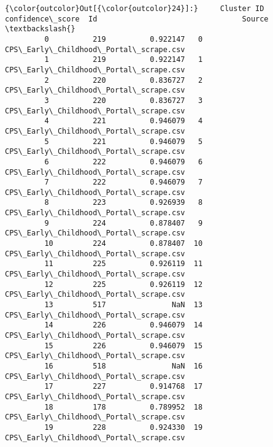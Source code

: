 \documentclass[11pt]{article}
\begin{document}
\begin{Verbatim}[commandchars=\\\{\}]
{\color{outcolor}Out[{\color{outcolor}24}]:}     Cluster ID  confidence\_score  Id                                 Source  \textbackslash{}
         0          219          0.922147   0  CPS\_Early\_Childhood\_Portal\_scrape.csv   
         1          219          0.922147   1  CPS\_Early\_Childhood\_Portal\_scrape.csv   
         2          220          0.836727   2  CPS\_Early\_Childhood\_Portal\_scrape.csv   
         3          220          0.836727   3  CPS\_Early\_Childhood\_Portal\_scrape.csv   
         4          221          0.946079   4  CPS\_Early\_Childhood\_Portal\_scrape.csv   
         5          221          0.946079   5  CPS\_Early\_Childhood\_Portal\_scrape.csv   
         6          222          0.946079   6  CPS\_Early\_Childhood\_Portal\_scrape.csv   
         7          222          0.946079   7  CPS\_Early\_Childhood\_Portal\_scrape.csv   
         8          223          0.926939   8  CPS\_Early\_Childhood\_Portal\_scrape.csv   
         9          224          0.878407   9  CPS\_Early\_Childhood\_Portal\_scrape.csv   
         10         224          0.878407  10  CPS\_Early\_Childhood\_Portal\_scrape.csv   
         11         225          0.926119  11  CPS\_Early\_Childhood\_Portal\_scrape.csv   
         12         225          0.926119  12  CPS\_Early\_Childhood\_Portal\_scrape.csv   
         13         517               NaN  13  CPS\_Early\_Childhood\_Portal\_scrape.csv   
         14         226          0.946079  14  CPS\_Early\_Childhood\_Portal\_scrape.csv   
         15         226          0.946079  15  CPS\_Early\_Childhood\_Portal\_scrape.csv   
         16         518               NaN  16  CPS\_Early\_Childhood\_Portal\_scrape.csv   
         17         227          0.914768  17  CPS\_Early\_Childhood\_Portal\_scrape.csv   
         18         178          0.789952  18  CPS\_Early\_Childhood\_Portal\_scrape.csv   
         19         228          0.924330  19  CPS\_Early\_Childhood\_Portal\_scrape.csv   
         

\end{Verbatim}
\end{document}
